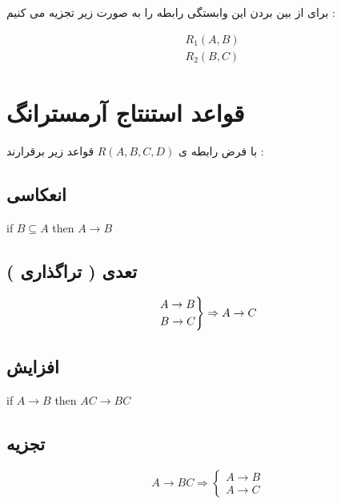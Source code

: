 \documentclass{article}
\begin{document}
برای از بین بردن این وابستگی رابطه را به صورت زیر تجزیه می کنیم :

\begin{align*}
&R_{1}(A, B) \\
&R_{2}(B, C)
\end{align*}



\newpage

\section{قواعد استنتاج آرمسترانگ}


با فرض رابطه ی $R(A,B,C,D)$ قواعد زیر برقرارند :

\subsection{انعکاسی}

\begin{latin}
	\begin{center}
		if $B \subseteq A$ then $A \to B$
	\end{center}
\end{latin}


\subsection{تعدی ( تراگذاری )}

\[
\begin{rcases*}
A \to B \\
B \to C
\end{rcases*} \Rightarrow A \to C
\]


\subsection{افزایش}

\begin{latin}
	\begin{center}
		if $A \to B$ then $AC \to BC$
	\end{center}
\end{latin}

\subsection{تجزیه}

\[
 A \to BC \Rightarrow
\begin{cases*}
A \to B \\
A \to C
\end{cases*} 
\]
\end{document}
